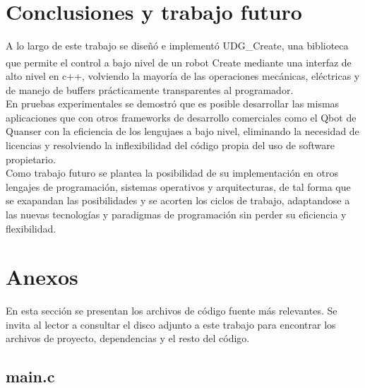 \documentclass[letterpaper,openright,12pt]{book}
\begin{document}
\chapter{Conclusiones y trabajo futuro}
A lo largo de este trabajo se diseñó e implementó UDG\_Create, una biblioteca que permite el control a bajo nivel de un robot Create\textsuperscript{\textregistered} mediante una interfaz de alto nivel en c++, volviendo la mayoría de las operaciones mecánicas, eléctricas y de manejo de buffers prácticamente transparentes al programador.\\
En pruebas experimentales se demostró que es posible desarrollar las mismas aplicaciones que con otros frameworks de desarrollo comerciales como el Qbot de Quanser con la eficiencia de los lengujaes a bajo nivel, eliminando la necesidad de licencias y resolviendo la inflexibilidad del código propia del uso de software propietario.\\
Como trabajo futuro se plantea la posibilidad  de su implementación en otros lengajes de programación, sistemas operativos y arquitecturas, de tal forma que se exapandan las posibilidades y se acorten los ciclos de trabajo, adaptandose a las nuevas tecnologías y paradigmas de programación sin perder su eficiencia y flexibilidad.




\chapter{Anexos}
En esta sección se presentan los archivos de código fuente más relevantes. Se invita al lector a consultar el disco adjunto a este trabajo para encontrar los archivos de proyecto, dependencias y el resto del código.


%

\section{main.c}



%
\end{document}
